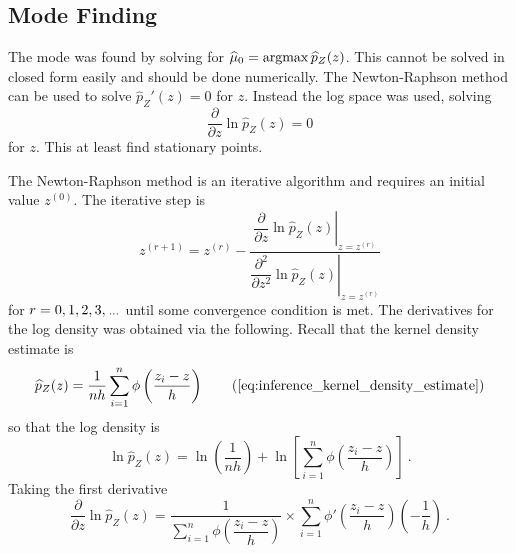 \subsection{Mode Finding}

The mode was found by solving for $\widehat{\mu}_0 = \operatorname*{argmax}\widehat{p}_Z(z)$. This cannot be solved in closed form easily and should be done numerically. The  Newton-Raphson method can be used to solve $\hat{p}_Z'(z) = 0$ for $z$. Instead the log space was used, solving
\begin{equation}
  \dfrac{
    \partial
  }
  {
    \partial z
  }
  \ln\widehat{p}_Z(z)
  = 0
\end{equation}
for $z$. This at least find stationary points.

The Newton-Raphson method is an iterative algorithm and requires an initial value $z^{(0)}$. The iterative step is
\begin{equation}
  z^{(r+1)} =
  z^{(r)}
  -\dfrac{
    \left.
      \dfrac{
        \partial
      }
      {
        \partial z
      }
      \ln\widehat{p}_Z(z)
    \right|_{z = z^{(r)}}
  }
  {
    \left.
      \dfrac{
        \partial^2
      }
      {
        \partial z^2
      }
      \ln\widehat{p}_Z(z)
    \right|_{z = z^{(r)}}
  } 
\end{equation}
for $r=0,1,2,3,\dotdotdot$ until some convergence condition is met. The derivatives for the log density was obtained via the following. Recall that the kernel density estimate is
\begin{equation}
  \widehat{p}_Z(z)=
  \frac{1}{nh}
  \sum_{i=1}^n\phi\left(
    \dfrac{z_i-z}{h}
  \right)
  \tag{\ref{eq:inference_kernel_density_estimate}}
\end{equation}
so that the log density is
\begin{equation}
  \ln\widehat{p}_Z(z)=
  \ln\left(
    \dfrac{1}{nh}
  \right)
  +
  \ln\left[
    \sum_{i=1}^n
    \phi\left(
      \dfrac{
        z_i - z
      }
      {
        h
      }
    \right)
  \right]
  \ .
\end{equation}
Taking the first derivative
\begin{equation}
  \dfrac{
    \partial
  }
  {
    \partial z
  }
  \ln\widehat{p}_Z(z)
  =
  \dfrac{
    1
  }
  {
    \sum_{i=1}^n
    \phi\left(
      \dfrac{
        z_i - z
      }
      {
        h
      }
    \right)
  }
  \times
  \sum_{i=1}^n
  \phi'\left(
    \dfrac{
      z_i - z
    }
    {
      h
    }
  \right)
  \left(
    -\dfrac{
      1
    }
    {
      h
    }
  \right)
  \ .
\end{equation}
